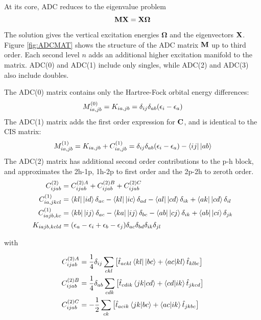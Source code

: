 At its core, ADC reduces to the eigenvalue problem
\begin{equation}
\mathbf{M}\mathbf{X} = \mathbf{X}\boldsymbol{\Omega}
\label{eq:ADCEVAL}
\end{equation}
\noindent The solution gives the vertical excitation energies $\boldsymbol{\Omega}$ and the eigenvectors $\mathbf{X}$. Figure \ref{fig:ADCMAT} shows the structure of the ADC matrix $\mathbf{M}$ up to third order. Each second level $n$ adds an additional higher excitation manifold to the matrix. ADC(0) and ADC(1) include only singles, while ADC(2) and ADC(3) also include doubles.

The ADC(0) matrix contains only the Hartree-Fock orbital energy differences:
\begin{equation}
M^{(0)}_{ia,jb} = K_{ia,jb} = \delta_{ij}\delta_{ab} (\epsilon_i - \epsilon_a) 
\end{equation}
\noindent The ADC(1) matrix adds the first order expression for $\mathbf{C}$, and is identical to the CIS matrix:
\begin{equation}
M^{(1)}_{ia,jb} = K_{ia,jb} + C_{ia,jb}^{(1)} = \delta_{ij}\delta_{ab} (\eps_i - \eps_a) - \sbra{ij}\sket{ab}
\end{equation} 
\noindent The ADC(2) matrix has additional second order contributions to the p-h block, and approximates the 2h-1p, 1h-2p to first order and the 2p-2h to zeroth order. 
\begin{align}
C_{ijab}^{(2)} &= C_{ijab}^{(2)A} + C_{ijab}^{(2)B} + C_{ijab}^{(2)C} 
\\
C_{ia,jkcl}^{(1)} &= \sbra{kl} \sket{id} \delta_{ac} - \sbra{kl} \sket{ic} \delta_{ad} - \sbra{al} \sket{cd} \delta_{ik} + \sbra{ak} \sket{cd} \delta_{il} 
\\
C_{iajb,kc}^{(1)} &= \sbra{kb} \sket{ij} \delta_{ac} - \sbra{ka} \sket{ij} \delta_{bc} - \bra{ab} \sket{cj} \delta_{ik} + \sbra{ab} \sket{ci} \delta_{jk} 
\\
K_{iajb,kcld} &= (\epsilon_a - \epsilon_i + \epsilon_b - \epsilon_j) \delta_{ac} \delta_{bd} \delta_{ik} \delta_{jl} 
\end{align}

\noindent with

\begin{align}
C_{ijab}^{(2)A} &= \frac{1}{4} \delta_{ij} \sum_{ckl} \left[  \hat{t}_{ackl} \bra{kl} \sket{bc}  +  \bra{ac} \ket{kl} \hat{t}_{klbc}\right] \\
C_{ijab}^{(2)B} &= \frac{1}{4} \delta_{ab} \sum_{cdk} \left[ \hat{t}_{cdik} \bra{jk} \ket{cd} + \bra{cd} \ket{ik} \hat{t}_{jkcd} \right] \\
C_{ijab}^{(2)C} &= - \frac{1}{2} \sum_{ck} \left[ \hat{t}_{acik}  \bra{jk} \ket{bc} + \bra{ac} \ket{ik} \hat{t}_{jkbc} \right] 
\end{align}

